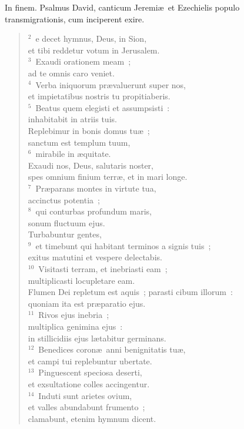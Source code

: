 \bchapter[Psalm]
In finem. Psalmus David, canticum Jeremi\ae\ et Ezechielis populo transmigrationis, cum inciperent exire.
\begin{verse}${}^{2}$~e decet hymnus, Deus, in Sion,\\ et tibi reddetur votum in Jerusalem.\\
${}^{3}$~Exaudi orationem meam~;\\ ad te omnis caro veniet.\\
${}^{4}$~Verba iniquorum pr\ae valuerunt super nos,\\ et impietatibus nostris tu propitiaberis.\\
${}^{5}$~Beatus quem elegisti et assumpsisti~:\\ inhabitabit in atriis tuis.\\ Replebimur in bonis domus tu\ae~;\\ sanctum est templum tuum,\\
${}^{6}$~mirabile in \ae quitate.\\ Exaudi nos, Deus, salutaris noster,\\ spes omnium finium terr\ae , et in mari longe.\\
${}^{7}$~Pr\ae parans montes in virtute tua,\\ accinctus potentia~;\\
${}^{8}$~qui conturbas profundum maris,\\ sonum fluctuum ejus.\\ Turbabuntur gentes,\\
${}^{9}$~et timebunt qui habitant terminos a signis tuis~;\\ exitus matutini et vespere delectabis.\\
${}^{10}$~Visitasti terram, et inebriasti eam~;\\ multiplicasti locupletare eam.\\ Flumen Dei repletum est aquis~; parasti cibum illorum~:\\ quoniam ita est pr\ae paratio ejus.\\
${}^{11}$~Rivos ejus inebria~;\\ multiplica genimina ejus~:\\ in stillicidiis ejus l\ae tabitur germinans.\\
${}^{12}$~Benedices coron\ae\ anni benignitatis tu\ae ,\\ et campi tui replebuntur ubertate.\\
${}^{13}$~Pinguescent speciosa deserti,\\ et exsultatione colles accingentur.\\
${}^{14}$~Induti sunt arietes ovium,\\ et valles abundabunt frumento~;\\ clamabunt, etenim hymnum dicent.\end{verse}



